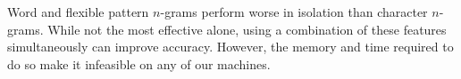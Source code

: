 \documentclass[twocolumn,10pt]{article}
\begin{document}
Word and flexible pattern $n$-grams perform worse in isolation than character $n$-grams.
While not the most effective alone, using a combination of these features simultaneously can improve accuracy\supercite{rocha2016authorship}.
However, the memory and time required to do so make it infeasible on any of our machines.
\end{document}
